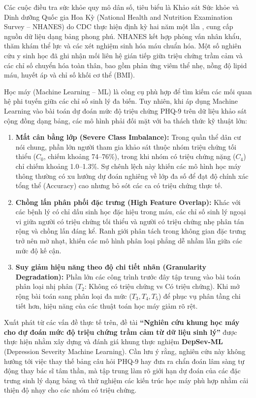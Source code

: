 Các cuộc điều tra sức khỏe quy mô dân số, tiêu biểu là Khảo sát Sức khỏe và Dinh dưỡng Quốc gia Hoa Kỳ (National Health and Nutrition Examination Survey -- NHANES) do CDC thực hiện định kỳ hai năm một lần \cite{cdc2014nhanes, cdc2016nhanes}, cung cấp nguồn dữ liệu dạng bảng phong phú. NHANES kết hợp phỏng vấn nhân khẩu, thăm khám thể lực và các xét nghiệm sinh hóa máu chuẩn hóa. Một số nghiên cứu y sinh học đã ghi nhận mối liên hệ gián tiếp giữa triệu chứng trầm cảm và các chỉ số chuyển hóa toàn thân, bao gồm phản ứng viêm thể nhẹ, nồng độ lipid máu, huyết áp và chỉ số khối cơ thể (BMI).

Học máy (Machine Learning -- ML) là công cụ phù hợp để tìm kiếm các mối quan hệ phi tuyến giữa các chỉ số sinh lý đa biến. Tuy nhiên, khi áp dụng Machine Learning vào bài toán dự đoán mức độ triệu chứng PHQ-9 trên dữ liệu khảo sát cộng đồng dạng bảng, các mô hình phải đối mặt với ba thách thức kỹ thuật lớn:
\begin{enumerate}
    \item \textbf{Mất cân bằng lớp (Severe Class Imbalance):} Trong quần thể dân cư nói chung, phần lớn người tham gia khảo sát thuộc nhóm triệu chứng tối thiểu ($C_0$, chiếm khoảng 74--76\%), trong khi nhóm có triệu chứng nặng ($C_4$) chỉ chiếm khoảng 1.0--1.3\%. Sự chênh lệch này khiến các mô hình học máy thông thường có xu hướng dự đoán nghiêng về lớp đa số để đạt độ chính xác tổng thể (Accuracy) cao nhưng bỏ sót các ca có triệu chứng thực tế.
    \item \textbf{Chồng lấn phân phối đặc trưng (High Feature Overlap):} Khác với các bệnh lý có chỉ dấu sinh học đặc hiệu trong máu, các chỉ số sinh lý ngoại vi giữa người có triệu chứng tối thiểu và người có triệu chứng nhẹ phân tán rộng và chồng lấn đáng kể. Ranh giới phân tách trong không gian đặc trưng trở nên mờ nhạt, khiến các mô hình phân loại phẳng dễ nhầm lẫn giữa các mức độ kế cận.
    \item \textbf{Suy giảm hiệu năng theo độ chi tiết nhãn (Granularity Degradation):} Phần lớn các công trình trước đây tập trung vào bài toán phân loại nhị phân ($T_2$: Không có triệu chứng vs Có triệu chứng). Khi mở rộng bài toán sang phân loại đa mức ($T_3, T_4, T_5$) để phục vụ phân tầng chi tiết hơn, hiệu năng của các thuật toán học máy giảm rõ rệt.
\end{enumerate}

Xuất phát từ các vấn đề thực tế trên, đề tài \textbf{“Nghiên cứu khung học máy cho dự đoán mức độ triệu chứng trầm cảm từ dữ liệu sinh lý”} được thực hiện nhằm xây dựng và đánh giá khung thực nghiệm \textbf{DepSev-ML} (Depression Severity Machine Learning). Cần lưu ý rằng, nghiên cứu này không hướng tới việc thay thế bảng câu hỏi PHQ-9 hay đưa ra chẩn đoán lâm sàng tự động thay bác sĩ tâm thần, mà tập trung làm rõ giới hạn dự đoán của các đặc trưng sinh lý dạng bảng và thử nghiệm các kiến trúc học máy phù hợp nhằm cải thiện độ nhạy cho các nhóm có triệu chứng.

